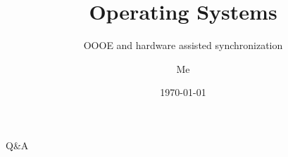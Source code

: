 \documentclass[12pt]{beamer}
\title{Operating Systems}
\subtitle{OOOE and hardware assisted synchronization}
\author{Me}
\date{\today}
\begin{document}
  \begin{frame}
    \titlepage
  \end{frame}

  
  
  
  

  \begin{frame}
  \begin{center}
  \Huge Q\&A
  \end{center}
  \end{frame}
\end{document}
